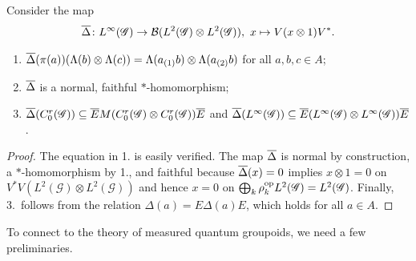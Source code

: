 Consider the map 
\begin{align*}
  \overline{\Delta} \colon L^{\infty}(\mathscr{G}) \to {\cal B}(L^{2}(\mathscr{G}) \otimes L^{2}(\mathscr{G})), \ x
  \mapsto V(x \otimes 1)V^{*}.
\end{align*}
\begin{Lem} \label{lemma:vn-delta}
  \begin{enumerate}
  \item $\overline{\Delta}(\pi(a)) (\Lambda(b) \otimes \Lambda(c)) =
    \Lambda(a_{(1)}b) \otimes \Lambda(a_{(2)}b)$ for all $a,b,c\in A$;
  \item $\overline{\Delta}$ is a normal, faithful $*$-homomorphism;
  \item  $\overline{\Delta}(C^{r}_{0}(\mathscr{G})) \subseteq \overline{E} M(C^{r}_{0}(\mathscr{G}) \otimes
  C^{r}_{0}(\mathscr{G}))\overline{E}$ and $\overline{\Delta}(L^{\infty}(\mathscr{G})) \subseteq \overline{E}(L^{\infty}(\mathscr{G}) \otimes
  L^{\infty}(\mathscr{G}))\overline{E}$.
  \end{enumerate}
\end{Lem}
\begin{proof}
  The equation in 1.{} is easily verified. The map $\overline{\Delta}$ is
  normal by construction, a $*$-homo\-morphism by 1.{}, and faithful
  because $\overline{\Delta}(x)=0$ implies $x\otimes 1=0$ on
  $V^{*}V(L^{2}(\mathscr{G}) \otimes L^{2}(\mathscr{G}))$ and hence
  $x=0$ on $\bigoplus_{k}
  \rho_{k}^{\operatorname{\mathrm{op}}}L^{2}(\mathscr{G})=L^{2}(\mathscr{G})$. Finally, 3.\
  follows from the relation $\Delta(a)=E\Delta(a)E$, which holds for
  all $a\in A$.
\end{proof}

To connect to the theory of measured quantum groupoids, we need a few
preliminaries.

